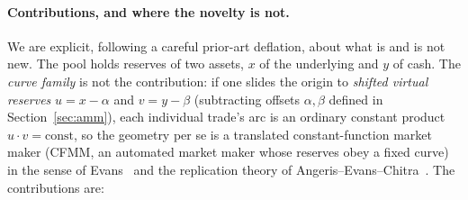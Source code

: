 \documentclass[11pt]{article}
\begin{document}
\paragraph{Contributions, and where the novelty is not.}
We are explicit, following a careful prior-art deflation, about what is and is
not new. The pool holds reserves of two assets, $x$ of the underlying and $y$ of
cash. The \emph{curve family} is not the contribution: if one slides the origin to
\emph{shifted virtual reserves} $u=x-\alpha$ and $v=y-\beta$ (subtracting offsets
$\alpha,\beta$ defined in Section~\ref{sec:amm}), each individual trade's arc is an
ordinary constant product $u\cdot v=\text{const}$, so the geometry per se is a
translated constant-function market maker (CFMM, an automated market maker whose
reserves obey a fixed curve) in the sense of Evans~\cite{evans2020} and the
replication theory of Angeris--Evans--Chitra~\cite{angeris-replicating}. The
contributions are:
\end{document}
